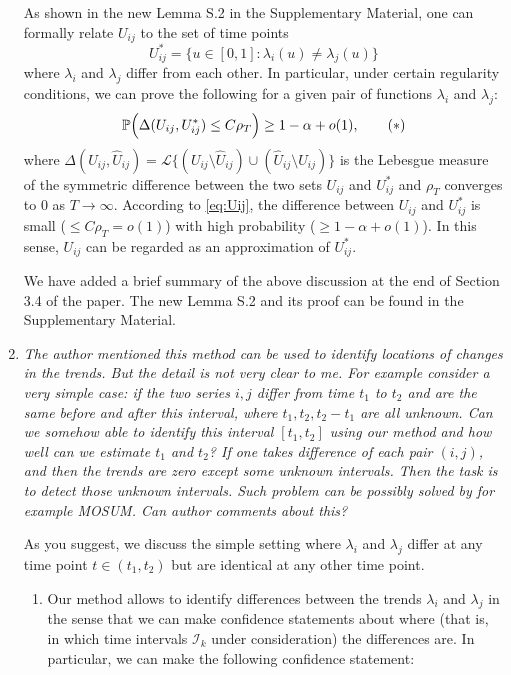 \documentclass[a4paper,12pt]{article}
\begin{document}
\begin{enumerate}[label=(\arabic*),leftmargin=0.7cm]
As shown in the new Lemma S.2 in the Supplementary Material, one can formally relate $U_{ij}$ to the set of time points 
\[ U_{ij}^* = \{ u \in [0,1]: \lambda_i(u) \ne \lambda_j(u) \} \]
where $\lambda_i$ and $\lambda_j$ differ from each other. In particular, under certain regularity conditions, we can prove the following for a given pair of functions $\lambda_i$ and $\lambda_j$: 
\begin{equation}\label{eq:Uij}
\mathbb{P}  \Big( \Delta(U_{ij}, U_{ij}^*) \le C \rho_T \Big) \ge 1-\alpha + o(1), \tag{$*$}
\end{equation}
where $\Delta(U_{ij},\hat{U}_{ij}) = \mathcal{L} \{(U_{ij} \setminus \hat{U}_{ij}) \cup (\hat{U}_{ij} \setminus U_{ij})\}$ is the Lebesgue measure of the symmetric difference between the two sets $U_{ij}$ and $U_{ij}^*$ and $\rho_T$ converges to $0$ as $T \to \infty$. According to \eqref{eq:Uij}, the difference between $U_{ij}$ and $U_{ij}^*$ is small ($\le C\rho_T = o(1)$) with high probability ($\ge 1 -\alpha + o(1)$). In this sense, $U_{ij}$ can be regarded as an approximation of $U_{ij}^*$. 

We have added a brief summary of the above discussion at the end of Section 3.4 of the paper. The new Lemma S.2 and its proof can be found in the Supplementary Material.


\item \textit{The author mentioned this method can be used to identify locations of changes in the trends. But the detail is not very clear to me. For example consider a very simple case: if the two series $i, j$ differ from time $t_1$ to $t_2$ and are the same before and after this interval, where $t_1, t_2, t_2 - t_1$ are all unknown. Can we somehow able to identify this interval $[t_1, t_2]$ using our method and how well can we estimate $t_1$ and $t_2$? If one takes difference of each pair $(i, j)$, and then the trends are zero except some unknown intervals. Then the task is to detect those unknown intervals. Such problem can be possibly solved by for example MOSUM. Can author comments about this?}

As you suggest, we discuss the simple setting where $\lambda_i$ and $\lambda_j$ differ at any time point $t \in (t_1,t_2)$ but are identical at any other time point.
\begin{enumerate}[label=(\roman*),leftmargin=0.75cm]

\item Our method allows to identify differences between the trends $\lambda_i$ and $\lambda_j$ in the sense that we can make confidence statements about where (that is, in which time intervals $\mathcal{I}_k$ under consideration) the differences are. In particular, we can make the following confidence statement: 
\vspace{0.1cm}


\end{enumerate}
\end{enumerate}
\end{document}
